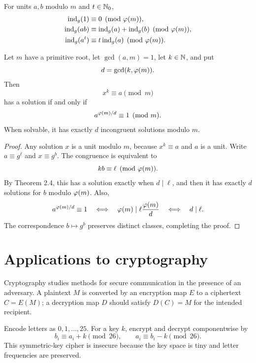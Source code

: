 \begin{thm}
For units $a,b$ modulo $m$ and $t\in\mathbb{N}_0$,
\begin{align*}
 \operatorname{ind}_g(1)&\equiv0\pmod{\varphi(m)},\\
 \operatorname{ind}_g(ab)&\equiv\operatorname{ind}_g(a)+\operatorname{ind}_g(b)\pmod{\varphi(m)},\\
 \operatorname{ind}_g(a^t)&\equiv t\operatorname{ind}_g(a)\pmod{\varphi(m)}.
\end{align*}
\end{thm}

\begin{thm}
Let $m$ have a primitive root, let $\gcd(a,m)=1$, let $k\in\mathbb{N}$, and put
\[
 d=\gcd(k,\varphi(m)).
\]
Then
\[
 x^k\equiv a\pmod m
\]
has a solution if and only if
\[
 a^{\varphi(m)/d}\equiv1\pmod m.
\]
When solvable, it has exactly $d$ incongruent solutions modulo $m$.
\end{thm}
\begin{proof}
Any solution $x$ is a unit modulo $m$, because $x^k\equiv a$ and $a$ is a unit.  Write $a\equiv g^\ell$ and $x\equiv g^b$.  The congruence is equivalent to
\[
 kb\equiv\ell\pmod{\varphi(m)}.
\]
By Theorem 2.4, this has a solution exactly when $d\mid\ell$, and then it has exactly $d$ solutions for $b$ modulo $\varphi(m)$.  Also,
\[
 a^{\varphi(m)/d}\equiv1
 \quad\Longleftrightarrow\quad
 \varphi(m)\mid \ell\frac{\varphi(m)}d
 \quad\Longleftrightarrow\quad d\mid\ell.
\]
The correspondence $b\mapsto g^b$ preserves distinct classes, completing the proof.
\end{proof}

\section{Applications to cryptography}

\begin{de}
Cryptography studies methods for secure communication in the presence of an adversary.  A plaintext $M$ is converted by an encryption map $E$ to a ciphertext $C=E(M)$; a decryption map $D$ should satisfy $D(C)=M$ for the intended recipient.
\end{de}

\begin{app}
Encode letters as $0,1,\ldots,25$.  For a key $k$, encrypt and decrypt componentwise by
\[
 b_i\equiv a_i+k\pmod{26},
 \qquad
 a_i\equiv b_i-k\pmod{26}.
\]
This symmetric-key cipher is insecure because the key space is tiny and letter frequencies are preserved.
\end{app}


